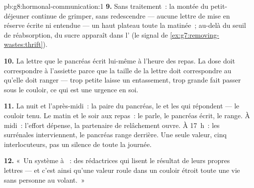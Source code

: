 \begin{solution}{pb:g8:hormonal-communication:1}
\textbf{9.} Sans traitement~: la montée du petit-déjeuner
continue de grimper, sans redescendre --- aucune lettre de
mise en réserve écrite ni entendue --- un haut plateau toute
la matinée~; au-delà du seuil de réabsorption, du sucre
apparaît dans l' (le signal de
\cref{ex:g7:removing-wastes:thrift}).

\textbf{10.} La lettre que le pancréas écrit lui-même à
l'heure des repas. La dose doit correspondre à l'assiette
parce que la taille de la lettre doit correspondre au
 qu'elle doit ranger --- trop petite laisse un
entassement, trop grande fait passer sous le couloir, ce qui
est une urgence en soi.

\textbf{11.} La nuit et l'après-midi~: la paire du pancréas,
le  et les  qui répondent --- le couloir tenu. Le
matin et le soir aux repas~: le  parle, le pancréas
écrit, le  range. À midi~: l'effort dépense, la
partenaire de relâchement ouvre. À 17~h~: les surrénales
interviennent, le pancréas range derrière. Une seule valeur,
cinq interlocuteurs, pas un silence de toute la journée.

\textbf{12.} «~Un système à ~: des rédactrices
qui lisent le résultat de leurs propres lettres --- et c'est
ainsi qu'une valeur roule dans un couloir étroit toute une
vie sans personne au volant.~»
\end{solution}

